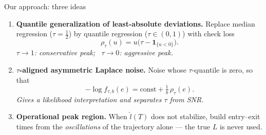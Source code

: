 \documentclass[aspectratio=54,10pt]{beamer}
\begin{document}
\begin{frame}{Our approach: three ideas}
	\justifying
	\begin{enumerate}
		\item \textbf{Quantile generalization of least-absolute deviations.}
		Replace median regression ($\tau=\tfrac12$) by quantile regression
		($\tau\in(0,1)$) with check loss
		\[
		\rho_\tau(u)=u\bigl(\tau-\mathbf 1_{\{u<0\}}\bigr).
		\]
		\smallskip
		\textit{$\tau\to 1$: conservative peak; \ $\tau\to 0$: aggressive peak.}
		\medskip
		\item \textbf{$\tau$-aligned asymmetric Laplace noise.}
		Noise whose $\tau$-quantile is zero, so that
		\[
		-\log f_{\tau,b}(e)=\text{const}+\tfrac{1}{b}\,\rho_\tau(e).
		\]
		\smallskip
		\textit{Gives a likelihood interpretation and separates $\tau$ from SNR.}
		\medskip
		\item \textbf{Operational peak region.}
		When $\hat l(T)$ does not stabilize, build entry--exit times from the
		\emph{oscillations} of the trajectory alone — the true $L$ is never used.
	\end{enumerate}
\end{frame}

\end{document}
